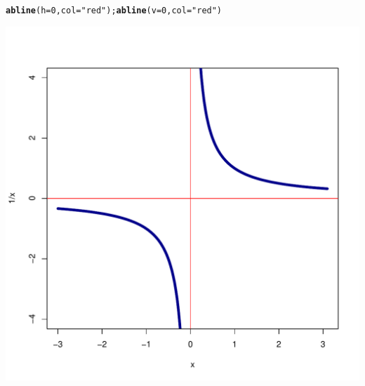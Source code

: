 \documentclass[onecolumn,11pt]{book}\usepackage[]{graphicx}\usepackage[]{color}
\makeatletter
\def\maxwidth{ %
  \ifdim\Gin@nat@width>\linewidth
    \linewidth
  \else
    \Gin@nat@width
  \fi
}
\newcommand{\hlnum}[1]{\textcolor[rgb]{0.686,0.059,0.569}{#1}}%
\newcommand{\hlstr}[1]{\textcolor[rgb]{0.192,0.494,0.8}{#1}}%
\newcommand{\hlstd}[1]{\textcolor[rgb]{0.345,0.345,0.345}{#1}}%
\newcommand{\hlkwc}[1]{\textcolor[rgb]{0.333,0.667,0.333}{#1}}%
\newcommand{\hlkwd}[1]{\textcolor[rgb]{0.737,0.353,0.396}{\textbf{#1}}}%
\newenvironment{kframe}{%
 \def\at@end@of@kframe{}%
 \ifinner\ifhmode%
  \def\at@end@of@kframe{\end{minipage}}%
  \begin{minipage}{\columnwidth}%
 \fi\fi%
 \def\FrameCommand##1{\hskip\@totalleftmargin \hskip-\fboxsep
 \colorbox{shadecolor}{##1}\hskip-\fboxsep
     \hskip-\linewidth \hskip-\@totalleftmargin \hskip\columnwidth}%
 \MakeFramed {\advance\hsize-\width
   \@totalleftmargin\z@ \linewidth\hsize
   \@setminipage}}%
 {\par\unskip\endMakeFramed%
 \at@end@of@kframe}
\newenvironment{knitrout}{}{} %
\makeatother
\begin{document}
\begin{itemize}
\begin{itemize}
\begin{knitrout}
\begin{kframe}
\begin{alltt}
  \hlkwd{abline}\hlstd{(}\hlkwc{h}\hlstd{=}\hlnum{0}\hlstd{,}\hlkwc{col}\hlstd{=}\hlstr{"red"}\hlstd{);} \hlkwd{abline}\hlstd{(}\hlkwc{v}\hlstd{=}\hlnum{0}\hlstd{,}\hlkwc{col}\hlstd{=}\hlstr{"red"}\hlstd{)}
\end{alltt}
\end{kframe}
\includegraphics[width=\maxwidth]{figure/unnamed-chunk-92-1} 

\end{knitrout}
\begin{figure}[ htbp]
\begin{center}


\end{center}
\end{figure}
\end{itemize}
\end{itemize}
\end{document}

